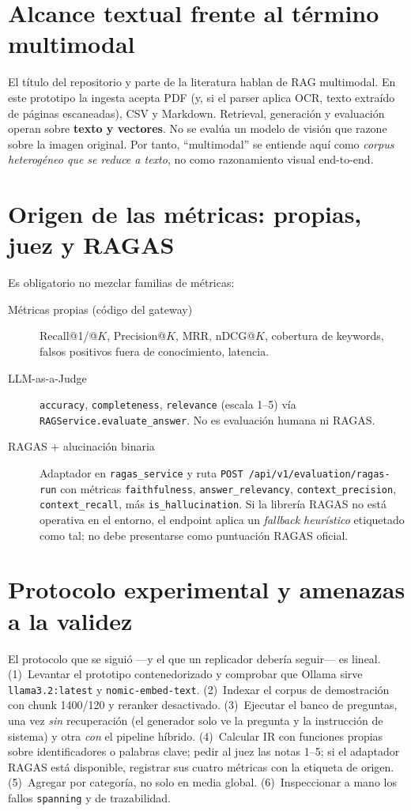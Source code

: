 \section{Alcance textual frente al término multimodal}
El título del repositorio y parte de la literatura hablan de RAG multimodal. En este prototipo la ingesta acepta PDF (y, si el parser aplica OCR, texto extraído de páginas escaneadas), CSV y Markdown. Retrieval, generación y evaluación operan sobre \textbf{texto y vectores}. No se evalúa un modelo de visión que razone sobre la imagen original. Por tanto, ``multimodal'' se entiende aquí como \emph{corpus heterogéneo que se reduce a texto}, no como razonamiento visual end-to-end.


\section{Origen de las métricas: propias, juez y RAGAS}
Es obligatorio no mezclar familias de métricas:

\begin{description}
  \item[Métricas propias (código del gateway)] Recall@1/@$K$, Precision@$K$, MRR, nDCG@$K$, cobertura de keywords, falsos positivos fuera de conocimiento, latencia.
  \item[LLM-as-a-Judge] \texttt{accuracy}, \texttt{completeness}, \texttt{relevance} (escala 1--5) vía \texttt{RAGService.evaluate\_answer}. No es evaluación humana ni RAGAS.
  \item[RAGAS + alucinación binaria] Adaptador en \texttt{ragas\_service} y ruta \texttt{POST /api/v1/evaluation/ragas-run} con métricas \texttt{faithfulness}, \texttt{answer\_relevancy}, \texttt{context\_precision}, \texttt{context\_recall}, más \texttt{is\_hallucination}. Si la librería RAGAS no está operativa en el entorno, el endpoint aplica un \emph{fallback heurístico} etiquetado como tal; no debe presentarse como puntuación RAGAS oficial.
\end{description}

\section{Protocolo experimental y amenazas a la validez}
El protocolo que se siguió ---y el que un replicador debería seguir--- es lineal. (1)~Levantar el prototipo contenedorizado y comprobar que Ollama sirve \texttt{llama3.2:latest} y \texttt{nomic-embed-text}. (2)~Indexar el corpus de demostración con chunk 1400/120 y reranker desactivado. (3)~Ejecutar el banco de preguntas, una vez \emph{sin} recuperación (el generador solo ve la pregunta y la instrucción de sistema) y otra \emph{con} el pipeline híbrido. (4)~Calcular IR con funciones propias sobre identificadores o palabras clave; pedir al juez las notas 1--5; si el adaptador RAGAS está disponible, registrar sus cuatro métricas con la etiqueta de origen. (5)~Agregar por categoría, no solo en media global. (6)~Inspeccionar a mano los fallos \texttt{spanning} y de trazabilidad.


